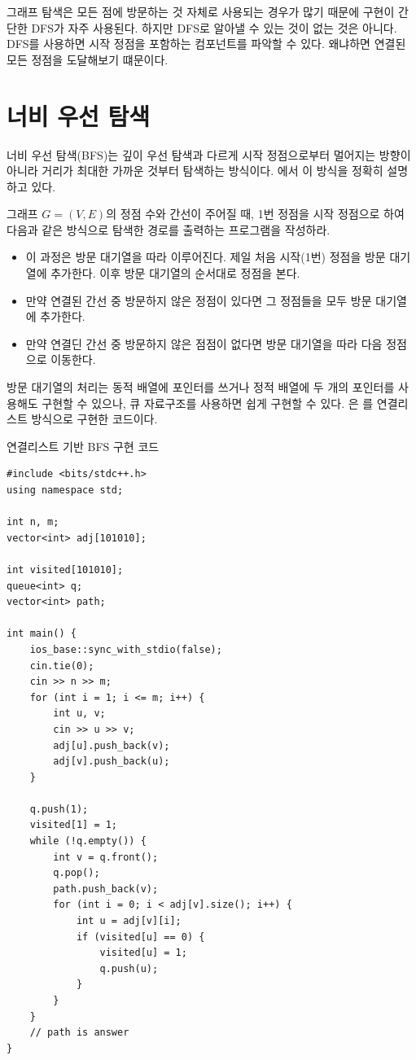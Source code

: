 그래프 탐색은 모든 점에 방문하는 것 자체로 사용되는 경우가 많기 때문에 구현이 간단한 DFS가 자주 사용된다. 
하지만 DFS로 알아낼 수 있는 것이 없는 것은 아니다. DFS를 사용하면 시작 정점을 포함하는 컴포넌트를 파악할 수 있다. 왜냐하면 연결된 모든 정점을 도달해보기 떄문이다.

\section{너비 우선 탐색}
너비 우선 탐색(BFS)는 깊이 우선 탐색과 다르게 시작 정점으로부터 멀어지는 방향이 아니라 거리가 최대한 가까운 것부터 탐색하는 방식이다. 에서 이 방식을 정확히 설명하고 있다.
\begin{example} \label{ex: BFS}
    그래프 $G = (V, E)$의 정점 수와 간선이 주어질 때, 1번 정점을 시작 정점으로 하여 다음과 같은 방식으로 탐색한 경로를 출력하는 프로그램을 작성하라.
    \begin{itemize}
        \item 이 과정은 방문 대기열을 따라 이루어진다. 제일 처음 시작(1번) 정점을 방문 대기열에 추가한다. 이후 방문 대기열의 순서대로 정점을 본다.
        \item 만약 연결된 간선 중 방문하지 않은 정점이 있다면 그 정점들을 모두 방문 대기열에 추가한다.
        \item 만약 연결딘 간선 중 방문하지 않은 점점이 없다면 방문 대기열을 따라 다음 정점으로 이동한다.
    \end{itemize}
\end{example}

방문 대기열의 처리는 동적 배열에 포인터를 쓰거나 정적 배열에 두 개의 포인터를 사용해도 구현할 수 있으나, 큐 자료구조를 사용하면 쉽게 구현할 수 있다. 은 를 연결리스트 방식으로 구현한 코드이다.
\begin{code} \label{code: BFS}
연결리스트 기반 BFS 구현 코드
\begin{lstlisting}
#include <bits/stdc++.h>
using namespace std;

int n, m;
vector<int> adj[101010];

int visited[101010];
queue<int> q;
vector<int> path;

int main() {
    ios_base::sync_with_stdio(false);
    cin.tie(0);
    cin >> n >> m;
    for (int i = 1; i <= m; i++) {
        int u, v;
        cin >> u >> v;
        adj[u].push_back(v);
        adj[v].push_back(u);
    }
    
    q.push(1);
    visited[1] = 1;
    while (!q.empty()) {
        int v = q.front();
        q.pop();
        path.push_back(v);
        for (int i = 0; i < adj[v].size(); i++) {
            int u = adj[v][i];
            if (visited[u] == 0) {
                visited[u] = 1;
                q.push(u);
            }
        }
    }
    // path is answer
}
\end{lstlisting}
\end{code}

